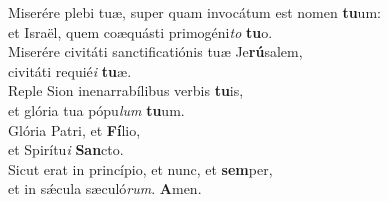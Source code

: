 \evenverse Miserére plebi tuæ, super quam invocátum est nomen \textbf{tu}um:~\*\\
\evenverse et Israël, quem coæquásti primogéni\textit{to} \textbf{tu}o.\\
\oddverse Miserére civitáti sanctificatiónis tuæ Je\textbf{rú}salem,~\*\\
\oddverse civitáti requié\textit{i} \textbf{tu}æ.\\
\evenverse Reple Sion inenarrabílibus verbis \textbf{tu}is,~\*\\
\evenverse et glória tua pópu\textit{lum} \textbf{tu}um.\\
\oddverse Glória Patri, et \textbf{Fí}lio,~\*\\
\oddverse et Spirítu\textit{i} \textbf{San}cto.\\
\evenverse Sicut erat in princípio, et nunc, et \textbf{sem}per,~\*\\
\evenverse et in sǽcula sæculó\textit{rum}. \textbf{A}men.\\
